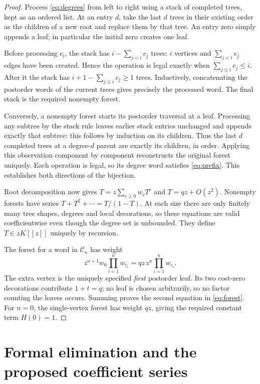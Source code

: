 \documentclass[11pt]{article}
\newcommand{\Cset}{\mathcal{C}}
\begin{document}
\begin{proof}
Process \eqref{eq:degrees} from left to right using a stack of completed
trees, kept as an ordered list. At an entry $d$, take the last $d$ trees
in their existing order as the children of a new root and replace them
by that tree. An entry zero simply appends a leaf; in particular the
initial zero creates one leaf.

Before processing $c_i$, the stack has
$i-\sum_{j<i}c_j$ trees: $i$ vertices and $\sum_{j<i}c_j$ edges have been
created. Hence the operation is legal exactly when
$\sum_{j\leq i}c_j\leq i$. After it the stack has
$i+1-\sum_{j\leq i}c_j\geq1$ trees. Inductively, concatenating the
postorder words of the current trees gives precisely the processed word.
The final stack is the required nonempty forest.

Conversely, a nonempty forest starts its postorder traversal at a leaf.
Processing any subtree by the stack rule leaves earlier stack entries
unchanged and appends exactly that subtree: this follows by induction on
its children. Thus the last $d$ completed trees at a degree-$d$ parent
are exactly its children, in order. Applying this observation component
by component reconstructs the original forest uniquely. Each operation
is legal, so its degree word satisfies \eqref{eq:prefix}. This establishes
both directions of the bijection.

Root decomposition now gives $T=z\sum_{c\geq0}w_cT^c$ and
$T=qz+O(z^2)$. Nonempty forests have series $T+T^2+\cdots=T/(1-T)$.
At each size there are only finitely many tree shapes, degrees and local
decorations, so these equations are valid coefficientwise even though the
degree set is unbounded. They define $T\in zK[[z]]$ uniquely by recursion.

The forest for a word in $\Cset_n$ has weight
\[
 z^{n+1}w_0\prod_{i=1}^n w_{c_i}
   =qz\,z^n\prod_{i=1}^n w_{c_i}.
\]
The extra vertex is the uniquely specified \emph{first} postorder leaf.
Its two cost-zero decorations contribute $1+t=q$; no leaf is chosen
arbitrarily, so no factor counting the leaves occurs. Summing proves the
second equation in \eqref{eq:forest}. For $n=0$, the single-vertex forest
has weight $qz$, giving the required constant term $H(0)=1$.
\end{proof}

\section{Formal elimination and the proposed coefficient series}
\end{document}
